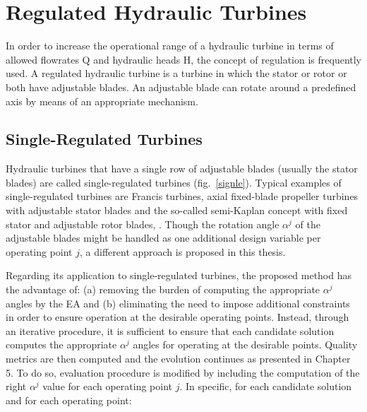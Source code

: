 

\ifpdf
    \graphicspath{{8/figures/PNG/}{8/figures/PDF/}{8/figures/}}
\else
    \graphicspath{{8/figures/EPS/}{8/figures/}}
\fi


\chapter{Regulated Hydraulic Turbines}

In order to increase the operational range of a hydraulic turbine in terms of allowed flowrates Q and hydraulic heads H, the concept of regulation is frequently used. A regulated hydraulic turbine is a turbine in which the stator or rotor or both have adjustable blades. An adjustable blade can rotate around a predefined axis by means of an appropriate mechanism. 


\section{Single-Regulated Turbines}
\label{single.regulated}

Hydraulic turbines that have a single row of adjustable blades (usually the stator blades) are called single-regulated turbines (fig.\ \ref{signle}). Typical examples of single-regulated turbines are Francis turbines, axial fixed-blade propeller turbines with adjustable stator blades and the so-called semi-Kaplan concept with fixed stator and adjustable rotor blades, \cite{papanto,drtina1999hydraulic}.  
Though the rotation angle $\alpha^j$ of the adjustable blades might be handled as one additional design variable per operating point $j$, a different approach is proposed in this thesis. 
                 

Regarding its application to single-regulated turbines, the proposed method has the advantage of: (a) removing the burden of computing the appropriate $\alpha^j$ angles by the EA and (b) eliminating the need to impose additional constraints in order to ensure operation at the desirable operating points. Instead, through an iterative procedure, it is sufficient to ensure  that each candidate solution computes the appropriate $\alpha^j$ angles for operating at the desirable points. Quality metrics are then computed and the evolution continues as presented in Chapter 5.  To do so, evaluation procedure is modified by including the computation of the right $\alpha^j$ value for each operating point $j$. In specific, for each candidate solution and for each operating point: 

